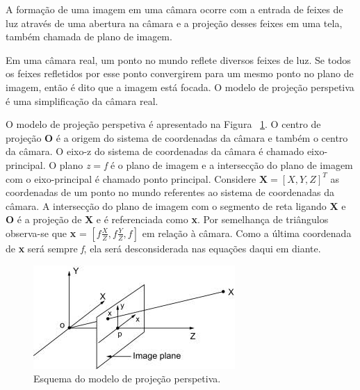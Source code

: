 A formação de uma imagem em uma câmara ocorre com a entrada de feixes de luz através de uma abertura na câmara e a projeção desses feixes em uma tela, também chamada de plano de imagem.

Em uma câmara real, um ponto no mundo reflete diversos feixes de luz. Se todos os feixes refletidos por esse ponto convergirem para um mesmo ponto no plano de imagem, então é dito que a imagem está focada. O modelo de projeção perspetiva é uma simplificação da câmara real.

O modelo de projeção perspetiva é apresentado na Figura ~\ref{fig:modelcamera}. O centro de projeção \textbf{O} é a origem do sistema de coordenadas da câmara e também o centro da câmara. O eixo-z do sistema de coordenadas da câmara é chamado eixo-principal. O plano \textit{z} = \textit{f} é o plano de imagem e a intersecção do plano de imagem com o eixo-principal é chamado ponto principal. Considere $\textbf{X} = [X,Y,Z]^T$ as coordenadas de um ponto no mundo referentes ao sistema de coordenadas da câmara. A intersecção do plano de imagem com o segmento de reta ligando \textbf{X} e \textbf{O} é a projeção de \textbf{X} e é referenciada como \textbf{x}. Por semelhança de triângulos observa-se que \textbf{x} = $[\textit{f} \frac{X}{Z}, \textit{f} \frac{Y}{Z}, \textit{f}]$ em relação à câmara. Como a última coordenada de \textbf{x} será sempre \textit{f}, ela será desconsiderada nas equações daqui em diante.

\begin{figure}[h!]  %
	\centering
	\includegraphics[width=0.6\linewidth]{figures/pinholemodel} 
	\caption{Esquema do modelo de projeção perspetiva. \cite{Yousif2015}}
	\label{fig:modelcamera}  %
\end{figure}

